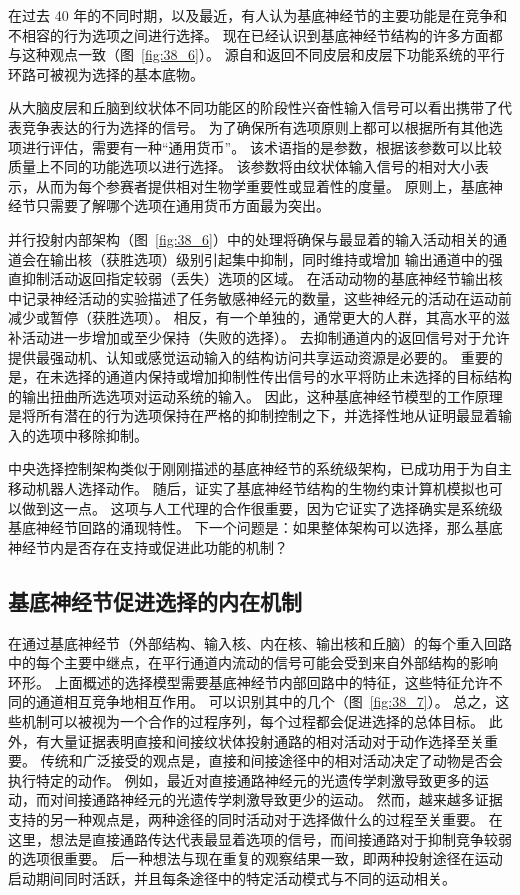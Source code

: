 在过去 40 年的不同时期，以及最近，有人认为基底神经节的主要功能是在竞争和不相容的行为选项之间进行选择。
现在已经认识到基底神经节结构的许多方面都与这种观点一致（图~\ref{fig:38_6}）。
源自和返回不同皮层和皮层下功能系统的平行环路可被视为选择的基本底物。


从大脑皮层和丘脑到纹状体不同功能区的阶段性兴奋性输入信号可以看出携带了代表竞争表达的行为选择的信号。
为了确保所有选项原则上都可以根据所有其他选项进行评估，需要有一种“通用货币”。
该术语指的是参数，根据该参数可以比较质量上不同的功能选项以进行选择。
该参数将由纹状体输入信号的相对大小表示，从而为每个参赛者提供相对生物学重要性或显着性的度量。
原则上，基底神经节只需要了解哪个选项在通用货币方面最为突出。


并行投射内部架构（图~\ref{fig:38_6}）中的处理将确保与最显着的输入活动相关的通道会在输出核（获胜选项）级别引起集中抑制，同时维持或增加 输出通道中的强直抑制活动返回指定较弱（丢失）选项的区域。
在活动动物的基底神经节输出核中记录神经活动的实验描述了任务敏感神经元的数量，这些神经元的活动在运动前减少或暂停（获胜选项）。
相反，有一个单独的，通常更大的人群，其高水平的滋补活动进一步增加或至少保持（失败的选择）。
去抑制通道内的返回信号对于允许提供最强动机、认知或感觉运动输入的结构访问共享运动资源是必要的。
重要的是，在未选择的通道内保持或增加抑制性传出信号的水平将防止未选择的目标结构的输出扭曲所选选项对运动系统的输入。
因此，这种基底神经节模型的工作原理是将所有潜在的行为选项保持在严格的抑制控制之下，并选择性地从证明最显着输入的选项中移除抑制。


中央选择控制架构类似于刚刚描述的基底神经节的系统级架构，已成功用于为自主移动机器人选择动作。
随后，证实了基底神经节结构的生物约束计算机模拟也可以做到这一点。
这项与人工代理的合作很重要，因为它证实了选择确实是系统级基底神经节回路的涌现特性。
下一个问题是：如果整体架构可以选择，那么基底神经节内是否存在支持或促进此功能的机制？


\subsection{基底神经节促进选择的内在机制}

在通过基底神经节（外部结构、输入核、内在核、输出核和丘脑）的每个重入回路中的每个主要中继点，在平行通道内流动的信号可能会受到来自外部结构的影响 环形。
上面概述的选择模型需要基底神经节内部回路中的特征，这些特征允许不同的通道相互竞争地相互作用。
可以识别其中的几个（图~\ref{fig:38_7}）。
总之，这些机制可以被视为一个合作的过程序列，每个过程都会促进选择的总体目标。
此外，有大量证据表明直接和间接纹状体投射通路的相对活动对于动作选择至关重要。
传统和广泛接受的观点是，直接和间接途径中的相对活动决定了动物是否会执行特定的动作。
例如，最近对直接通路神经元的光遗传学刺激导致更多的运动，而对间接通路神经元的光遗传学刺激导致更少的运动。
然而，越来越多证据支持的另一种观点是，两种途径的同时活动对于选择做什么的过程至关重要。
在这里，想法是直接通路传达代表最显着选项的信号，而间接通路对于抑制竞争较弱的选项很重要。
后一种想法与现在重复的观察结果一致，即两种投射途径在运动启动期间同时活跃，并且每条途径中的特定活动模式与不同的运动相关。



